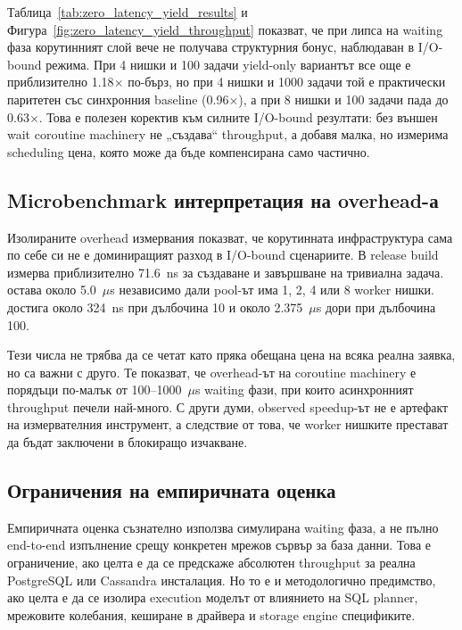 Таблица~\ref{tab:zero_latency_yield_results} и Фигура~\ref{fig:zero_latency_yield_throughput} показват, че при липса на waiting фаза корутинният слой вече не получава структурния бонус, наблюдаван в I/O-bound режима. При 4 нишки и 100 задачи yield-only вариантът все още е приблизително 1.18$\times$ по-бърз, но при 4 нишки и 1000 задачи той е практически паритетен със синхронния baseline (0.96$\times$), а при 8 нишки и 100 задачи пада до 0.63$\times$. Това е полезен коректив към силните I/O-bound резултати: без външен wait coroutine machinery не „създава“ throughput, а добавя малка, но измерима scheduling цена, която може да бъде компенсирана само частично.

\subsection{Microbenchmark интерпретация на overhead-а}

Изолираните overhead измервания показват, че корутинната инфраструктура сама по себе си не е доминиращият разход в I/O-bound сценариите. В release build  измерва приблизително 71.6~ns за създаване и завършване на тривиална задача.  остава около 5.0~$\mu$s независимо дали pool-ът има 1, 2, 4 или 8 worker нишки.  достига около 324~ns при дълбочина 10 и около 2.375~$\mu$s дори при дълбочина 100.

Тези числа не трябва да се четат като пряка обещана цена на всяка реална заявка, но са важни с друго. Те показват, че overhead-ът на coroutine machinery е порядъци по-малък от 100--1000~$\mu$s waiting фази, при които асинхронният throughput печели най-много. С други думи, observed speedup-ът не е артефакт на измервателния инструмент, а следствие от това, че worker нишките престават да бъдат заключени в блокиращо изчакване.

\subsection{Ограничения на емпиричната оценка}

Емпиричната оценка съзнателно използва симулирана waiting фаза, а не пълно end-to-end изпълнение срещу конкретен мрежов сървър за база данни. Това е ограничение, ако целта е да се предскаже абсолютен throughput за реална PostgreSQL или Cassandra инсталация. Но то е и методологично предимство, ако целта е да се изолира execution моделът от влиянието на SQL planner, мрежовите колебания, кеширане в драйвера и storage engine спецификите.

